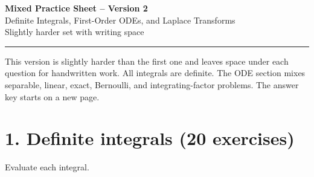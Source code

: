 \documentclass[11pt,a4paper]{article}
\begin{document}
\begin{center}
    {\LARGE \textbf{Mixed Practice Sheet -- Version 2}}\\[0.4em]
    {\large Definite Integrals, First-Order ODEs, and Laplace Transforms}\\[0.5em]
    {\normalsize Slightly harder set with writing space}\\[0.8em]
    \rule{0.9\textwidth}{0.6pt}
\end{center}

This version is slightly harder than the first one and leaves space under each question for handwritten work. All integrals are definite. The ODE section mixes separable, linear, exact, Bernoulli, and integrating-factor problems. The answer key starts on a new page.

\section*{1. Definite integrals (20 exercises)}
Evaluate each integral.
\end{document}
